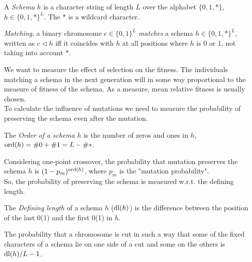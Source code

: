 \begin{definition}
	A \textit{Schema} $h$ is a character string of length $L$ over the alphabet $\{0,1,\ast\}$, $h \in \{0,1,\ast\}^L$. The $\ast$ is a wildcard character.\\
\end{definition}

\begin{definition}
	\textit{Matching}, a binary chromosome $c \in \{0,1\}^L$ \textit{matches} a schema $h \in \{0,1,\ast\}^L$, written as $c \triangleleft h$ iff it coincides with $h$ at all positions where $h$ is 0 or 1, not taking into account $\ast$.\\
\end{definition}

We want to measure the effect of selection on the fitness. The individuals matching a schema in the next generation will in some way proportional to the measure of fitness of the schema. As a measure, mean relative fitness is usually chosen.\\

To calculate the influence of mutations we need to measure the probability of preserving the schema even after the mutation.\\

\begin{definition}
	The \textit{Order of a schema} $h$ is the number of zeros and ones in $h$, $\operatorname{ord}(h) = \# 0 + \# 1 = L - \#\ast$.\\
\end{definition}


Considering one-point crossover, the probability that mutation preserves the schema $h$ is $(1-p_m)^{\operatorname{ord}(h)}$, where $p_m$ is the "mutation probability".\\
So, the probability of preserving the schema is measured w.r.t. the defining length.\\

\begin{definition}
	The \textit{Defining length} of a schema $h$ ($\operatorname{dl}(h)$) is the difference between the position  of the last 0(1) and the first 0(1) in $h$.\\
\end{definition}

\begin{definition}
	The probability that a chromosome is cut in such a way that some of the fixed characters of a schema lie on one side of a cut and some on the others is $\operatorname{dl}(h)/L-1$.\\
\end{definition}


